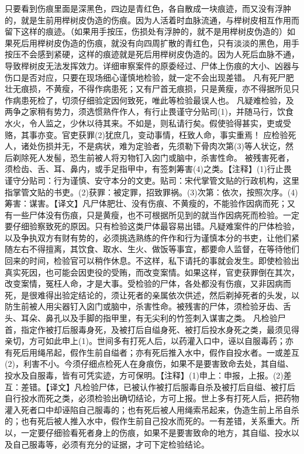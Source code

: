 \documentclass[12pt,UTF8]{ctexbook}
\begin{document}
只要看到伤痕里面是深黑色，四边是青红色，各自散成一块痕迹，而又没有浮肿的，就是生前用榉树皮伪造的伤痕。因为人活着时血脉流通，与榉树皮相互作用而留下这样的痕迹。（如果用手按压，伤损处有浮肿的，就不是用榉树皮伪造的）如果死后用榉树皮伪造的伤痕，就没有向四周扩散的青红色，只有淡淡的黑色，用手按压不会感到紧硬，这样的痕迹就是死后用榉树皮伪造的。因为人死后血脉不通，导致榉树皮无法发挥效力。详细审察案件的原委经过、尸体上伤痕的大小、凶器与伤口是否对应，只要在现场细心谨慎地检验，就一定不会出现差错。
凡有死尸肥壮无痕损，不黄瘦，不得作病患死；又有尸首无痕损，只是黄瘦，亦不得据所见只作病患死检了，切须仔细验定因何致死，唯此等检验最误人也。
凡疑难检验，及两争之家稍有势力，须选惯熟仵作人，有行止畏谨守分贴司(1)，并随马行，饮食水火，令人监之，少休以待其来。不如是，则私请行矣。假使验得甚实，吏或受赂，其事亦变。官吏获罪(2)犹庶几，变动事情，枉致人命，事实重焉！
应检验死人，诸处伤损并无，不是病状，难为定验者，先须勒下骨肉次第(3)等人状讫，然后剃除死人发髻，恐生前被人将刃物钉入囟门或脑中，杀害性命。
被残害死者，须检齿、舌、耳、鼻内，或手足指甲中，有签刺筹害(4)之类。【注释】(1)行止畏谨守分贴司：行为谨慎、安守本分的文吏。贴司：宋代掌管文贴的行政机构，这里指掌管文贴的书吏。(2)获罪：被定罪，招致罪祸。(3)次第：依次，按照次序。(4)筹害：谋害。【译文】凡尸体肥壮、没有伤痕、不黄瘦的，不能验作因病而死；又有一些尸体没有伤痕，只是黄瘦，也不可根据所见到的就当作因病死而检验。一定要仔细验察致死的原因。只有检验这类尸体最容易出错。凡疑难案件的尸体检验，以及争执双方有财有势的，必须挑选熟练的仵作和行为谨慎本分的书吏，让他们紧随左右不得擅离，其饮食、取水、生火、做饭等事宜，都要命人监督，在等待他们回来的时间，检验官可以稍作休息。不这样，私下请托的事就会发生。即使检验出真实死因，也可能会因吏役的受贿，而改变案情。如果这样，官吏获罪倒在其次，改变案情，冤枉人命，才是大事。受检验的尸体，各处都没有伤痕，又非因病而死，是很难得出验定结论的，须让死者的亲属依次供述，然后剃掉死者的头发，以防生前被人用尖器钉入囟门或脑中，杀害性命。被残害的尸体，须检验牙齿、舌头、耳朵、鼻孔以及手脚的指甲里，有无尖利的竹签刺入谋害之类。
凡检验尸首，指定作被打后服毒身死，及被打后自缢身死、被打后投水身死之类，最须见得亲切，方可如此申上(1)。世间多有打死人后，以药灌入口中，诬以自服毒药；亦有死后用绳吊起，假作生前自缢者；亦有死后推入水中，假作自投水者。一或差互(2)，利害不小。今须仔细点检死人在身痕伤，如果不是要害致命去处，其自缢、投水及自服毒，皆有可凭实迹，方可保明。【注释】(1)申上：申报，上报。(2)差互：差错。【译文】凡检验尸体，已被认作被打后服毒自杀及被打后自缢、被打后自行投水而死之类，必须检验出确切结论，方可上报。世上多有打死人后，把药物灌入死者口中却诬陷自己服毒的；也有死后被人用绳索吊起来，伪造生前上吊自杀的；也有死后被人推入水中，假作生前自己投水而死的。一有差错，关系重大。所以，一定要仔细验看死者身上的伤痕，如果不是要害致命的地方，其自缢、投水以及自己服毒等，必须有充分的证据，才可下定检验结论。
\end{document}
